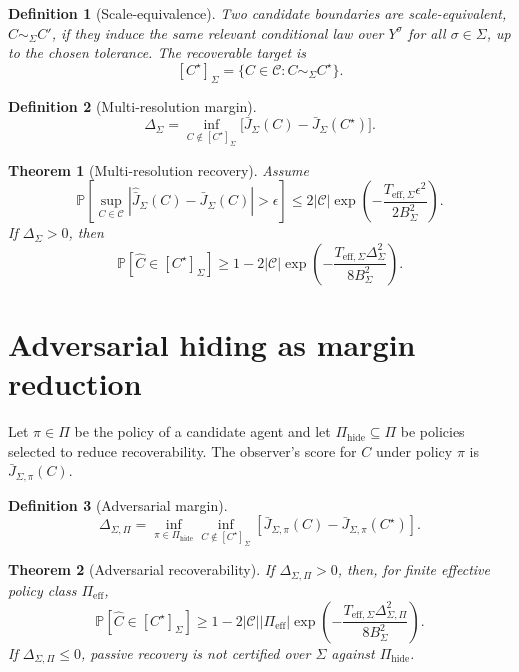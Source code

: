\documentclass[10pt]{article}
\newtheorem{definition}{Definition}
\newtheorem{theorem}{Theorem}
\newcommand{\Pbb}{\mathbb P}
\newcommand{\cC}{\mathcal C}
\begin{document}
\begin{definition}[Scale-equivalence]
Two candidate boundaries are scale-equivalent, \(C\sim_\Sigma C'\), if they induce the same relevant conditional law over \(Y^\sigma\) for all \(\sigma\in\Sigma\), up to the chosen tolerance. The recoverable target is
\[
[C^\star]_\Sigma=\{C\in\cC:C\sim_\Sigma C^\star\}.
\]
\end{definition}

\begin{definition}[Multi-resolution margin]
\[
\Delta_\Sigma
=
\inf_{C\notin[C^\star]_\Sigma}
\bigl[
\bar J_\Sigma(C)-\bar J_\Sigma(C^\star)
\bigr].
\]
\end{definition}

\begin{theorem}[Multi-resolution recovery]
Assume
\[
\Pbb\!\left[
\sup_{C\in\cC}|\widehat{\bar J}_\Sigma(C)-\bar J_\Sigma(C)|>\epsilon
\right]
\le
2|\cC|
\exp\!\left(
-\frac{T_{\mathrm{eff},\Sigma}\epsilon^2}{2B_\Sigma^2}
\right).
\]
If \(\Delta_\Sigma>0\), then
\begin{equation}
\Pbb[\hat C\in[C^\star]_\Sigma]
\ge
1-
2|\cC|
\exp\!\left(
-\frac{T_{\mathrm{eff},\Sigma}\Delta_\Sigma^2}{8B_\Sigma^2}
\right).
\label{eq:multi_filter_recovery}
\end{equation}
\end{theorem}

\section{Adversarial hiding as margin reduction}

Let \(\pi\in\Pi\) be the policy of a candidate agent and let \(\Pi_{\mathrm{hide}}\subseteq\Pi\) be policies selected to reduce recoverability. The observer's score for \(C\) under policy \(\pi\) is \(\bar J_{\Sigma,\pi}(C)\).

\begin{definition}[Adversarial margin]
\[
\Delta_{\Sigma,\Pi}
=
\inf_{\pi\in\Pi_{\mathrm{hide}}}
\inf_{C\notin[C^\star]_\Sigma}
\left[
\bar J_{\Sigma,\pi}(C)-\bar J_{\Sigma,\pi}(C^\star)
\right].
\]
\end{definition}

\begin{theorem}[Adversarial recoverability]
If \(\Delta_{\Sigma,\Pi}>0\), then, for finite effective policy class \(\Pi_{\mathrm{eff}}\),
\begin{equation}
\Pbb[\hat C\in[C^\star]_\Sigma]
\ge
1-
2|\cC||\Pi_{\mathrm{eff}}|
\exp\!\left(
-\frac{T_{\mathrm{eff},\Sigma} \Delta_{\Sigma,\Pi}^2}{8B_\Sigma^2}
\right).
\label{eq:adv_recovery}
\end{equation}
If \(\Delta_{\Sigma,\Pi}\le0\), passive recovery is not certified over \(\Sigma\) against \(\Pi_{\mathrm{hide}}\).
\end{theorem}
\end{document}
